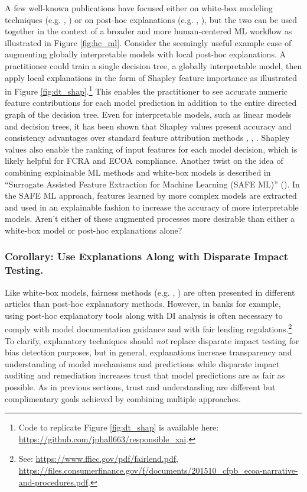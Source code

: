 \documentclass{article}
\begin{document}
A few well-known publications have focused either on white-box modeling techniques (e.g. \citet{slim}, \citet{sbrl}) or on post-hoc explanations (e.g.  \citet{shapley}, \citet{lime}), but the two can be used together in the context of a broader and more human-centered ML workflow as illustrated in Figure \ref{fig:hc_ml}. Consider the seemingly useful example case of augmenting globally interpretable models with local post-hoc explanations. A practitioner could train a single decision tree, a globally interpretable model, then apply local explanations in the form of Shapley feature importance as illustrated in Figure \ref{fig:dt_shap}.\footnote{Code to replicate Figure \ref{fig:dt_shap} is available here: \url{https://github.com/jphall663/responsible_xai}.} This enables the practitioner to see accurate numeric feature contributions for each model prediction in addition to the entire directed graph of the decision tree. Even for interpretable models, such as linear models and decision trees, it has been shown that Shapley values present accuracy and consistency advantages over standard feature attribution methods \cite{lipovetsky2001analysis}, \cite{tree_shap}, \cite{shapley}. Shapley values also enable the ranking of input features for each model decision, which is likely helpful for FCRA and ECOA compliance. Another twist on the idea of combining explainable ML methods and white-box models is described in ``Surrogate Assisted Feature Extraction for Machine Learning (SAFE ML)'' (\citet{gosiewska2019safe}). In the SAFE ML approach, features learned by more complex models are extracted and used in an explainable fashion to increase the accuracy of more interpretable models. Aren't either of these augmented processes more desirable than either a white-box model or post-hoc explanations alone?\\ 

\subsubsection{Corollary: Use Explanations Along with Disparate Impact Testing.} Like white-box models, fairness methods (e.g. \citet{feldman2015certifying}, \citet{hardt2016equality}) are often presented in different articles than post-hoc explanatory methods. However, in banks for example, using post-hoc explanatory tools along with DI analysis is often necessary to comply with model documentation guidance and with fair lending regulations.\footnote{\scriptsize{See: \url{https://www.ffiec.gov/pdf/fairlend.pdf}, \url{https://files.consumerfinance.gov/f/documents/201510_cfpb_ecoa-narrative-and-procedures.pdf}.}} To clarify, explanatory techniques should \textit{not} replace disparate impact testing for bias detection purposes, but in general, explanations increase transparency and understanding of model mechanisms and predictions while disparate impact auditing and remediation increases trust that model predictions are as fair as possible. As in previous sections, trust and understanding are different but complimentary goals achieved by combining multiple approaches.
\end{document}
